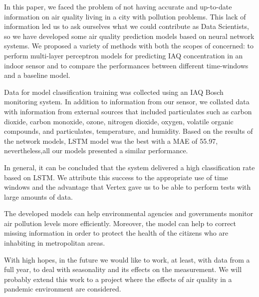 \documentclass{llncs}
\begin{document}
In this paper, we faced the problem of not having accurate and
up-to-date information on air quality living in a city with pollution
problems. This lack of information led us to ask ourselves what we could
contribute as Data Scientists, so we have developed some air quality
prediction models based on neural network systems. We proposed a variety
of methods with both the scopes of concerned: to perform multi-layer
perceptron models for predicting IAQ concentration in an indoor sensor
and to compare the performances between different time-windows and a
baseline model.

Data for model classification training was collected using an IAQ Bosch
monitoring system. In addition to information from our sensor, we
collated data with information from external sources that included
particulates such as carbon dioxide, carbon monoxide, ozone, nitrogen
dioxide, oxygen, volatile organic compounds, and particulates,
temperature, and humidity. Based on the results of the network models,
LSTM model was the best with a MAE of 55.97, nevertheless,all our models 
presented a similar performance.

In general, it can be concluded that the system delivered a high
classification rate based on LSTM. We attribute this success to the
appropriate use of time windows and the advantage that Vertex gave us to
be able to perform tests with large amounts of data.

The developed models can help environmental agencies and governments
monitor air pollution levels more efficiently. Moreover, the model can
help to correct missing information in order to protect the health of
the citizens who are inhabiting in metropolitan areas.

With high hopes, in the future we would like to work, at least, with
data from a full year, to deal with seasonality and its effects on the
measurement. We will probably extend this work to a project where the
effects of air quality in a pandemic environment are considered.

\end{document}
